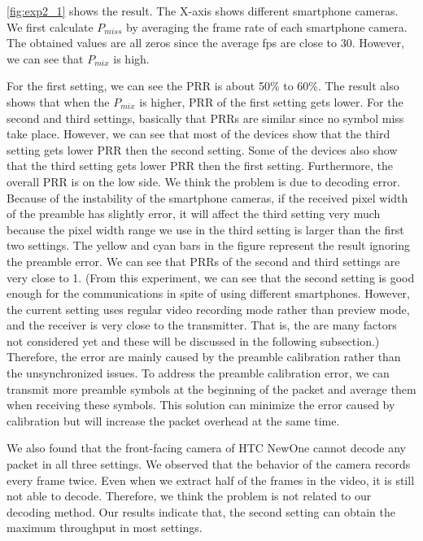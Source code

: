 \autoref{fig:exp2_1} shows the result. The X-axis shows different smartphone cameras. We first calculate $P_{miss}$ by averaging the frame rate of each smartphone camera. The obtained values are all zeros since the average fps are close to 30. However, we can see that $P_{mix}$ is high.

For the first setting, we can see the PRR is about 50\% to 60\%. The result also shows that when the $P_{mix}$ is higher, PRR of the first setting gets lower.
For the second and third settings, basically that PRRs are similar since no symbol miss take place. However, we can see that most of the devices show that the third setting gets lower PRR then the second setting. Some of the devices also show that the third setting gets lower PRR then the first setting. Furthermore, the overall PRR is on the low side. We think the problem is due to decoding error. Because of the instability of the smartphone cameras, if the received pixel width of the preamble has slightly error, it will affect the third setting very much because the pixel width range we use in the third setting is larger than the first two settings. The yellow and cyan bars in the figure represent the result ignoring the preamble error. We can see that PRRs of the second and third settings are very close to 1. (From this experiment, we can see that the second setting is good enough for the communications in spite of using different smartphones. However, the current setting uses regular video recording mode rather than preview mode, and the receiver is very close to the transmitter. That is, the are many factors not considered yet and these will be discussed in the following subsection.) Therefore, the error are mainly caused by the preamble calibration rather than the unsynchronized issues. To address the preamble calibration error, we can transmit more preamble symbols at the beginning of the packet and average them when receiving these symbols. This solution can minimize the error caused by calibration but will increase the packet overhead at the same time.

We also found that the front-facing camera of HTC NewOne cannot decode any packet in all three settings. We observed that the behavior of the camera records every frame twice. Even when we extract half of the frames in the video, it is still not able to decode.
Therefore, we think the problem is not related to our decoding method.
Our results indicate that, the second setting can obtain the maximum throughput in most settings.

